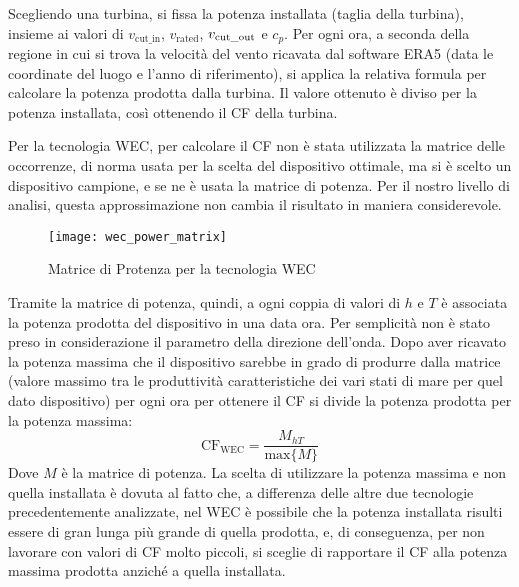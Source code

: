 \documentclass[fleqn,11pt]{SelfArx} %
\begin{document}
Scegliendo una turbina, si fissa la potenza installata (taglia della turbina), insieme ai valori di $v_{\text{cut\_in}}$, $v_{\text{rated}}$, $v_{\text{cut\_out}}$ e $c_p$.
Per ogni ora, a seconda della regione in cui si trova la velocità del vento ricavata dal software ERA5 (data le coordinate del luogo e l'anno di riferimento), si applica la relativa formula per calcolare la potenza prodotta dalla turbina.
Il valore ottenuto è diviso per la potenza installata, così ottenendo il CF della turbina. 

Per la tecnologia WEC, per calcolare il CF non è stata utilizzata la matrice delle occorrenze, di norma usata per la scelta del dispositivo ottimale, ma si è scelto un dispositivo campione, e se ne è usata la matrice di potenza.
Per il nostro livello di analisi, questa approssimazione non cambia il risultato in maniera considerevole.

\begin{figure}[ht]\centering
	\texttt{[image: wec\_power\_matrix]}
	\caption{Matrice di Protenza per la tecnologia WEC}
	\label{fig:wec_power_matrix}
\end{figure}

Tramite la matrice di potenza, quindi, a ogni coppia di valori di $h$ e $T$ è associata la potenza prodotta del dispositivo in una data ora.
Per semplicità non è stato preso in considerazione il parametro della direzione dell'onda. 
Dopo aver ricavato la potenza massima che il dispositivo sarebbe in grado di produrre dalla matrice (valore massimo tra le produttività caratteristiche dei vari stati di mare per quel dato dispositivo) per ogni ora per ottenere il CF si divide la potenza prodotta per la potenza massima:
\begin{equation}
	\text{CF}_\text{WEC} = \frac{M_{hT}}{\text{max}\{M\}}
\end{equation}
Dove $M$ è la matrice di potenza.
La scelta di utilizzare la potenza massima e non quella installata è dovuta al fatto che, a differenza delle altre due tecnologie precedentemente analizzate, nel WEC è possibile che la potenza installata risulti essere di gran lunga più grande di quella prodotta, e, di conseguenza, per non lavorare con valori di CF molto piccoli, si sceglie di rapportare il CF alla potenza massima prodotta anziché a quella installata. 
\end{document}
